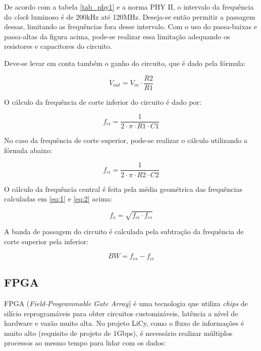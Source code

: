 	De acordo com a tabela \ref{tab_phy1} e a norma PHY II, o intervalo da frequência do \textit{clock} luminoso é de 200kHz até 120MHz. Deseja-se então  permitir a passagem dessas, limitando as frequências fora desse intervalo. Com o uso do passa-baixas e passa-altas da figura acima, pode-se realizar essa limitação adequando os resistores e capacitores do circuito.
	
	Deve-se levar em conta também o ganho do circuito, que é dado pela fórmula:
	
	\begin{equation}
	V_{out} = V_{in} \cdot \frac{R2}{R1}
	\end{equation}
	
	O cálculo da frequência de corte inferior do circuito é dado por: 
	
	\begin{equation} \label{eq:1}
	f_{ci} = \frac{1}{2 \cdot \pi \cdot R1 \cdot C1}
	\end{equation}
	
	No caso da frequência de corte superior, pode-se realizar o cálculo utilizando a fórmula abaixo:
	
	\begin{equation} \label{eq:2}
	f_{ci} = \frac{1}{2 \cdot \pi \cdot R2 \cdot C2}
	\end{equation}
	
	O cálculo da frequência central é feita pela média geométrica das frequências calculadas em \ref{eq:1} e \ref{eq:2} acima: 
	
	\begin{equation} \label{eq:3}
	f_{o} = \sqrt{f_{ci} \cdot f_{cs}}
	\end{equation}
	
	A banda de passagem do circuito é calculada pela subtração da frequência de corte superior pela inferior:
	
	\begin{equation} \label{eq:4}
	BW = f_{cs} - f_{ci}
	\end{equation}
	
	\subsection{FPGA}\label{hard-fpga}
	
	FPGA (\textit{Field-Programmable Gate Array}) é uma tecnologia que utiliza \textit{chips} de silício reprogramáveis para obter circuitos customizáveis, latência a nível de hardware e vazão muito alta. No projeto LiCy, como o fluxo de informações é muito alto (requisito de projeto de 1Gbps), é necessário realizar múltiplos processos ao mesmo tempo para lidar com os dados:
	
